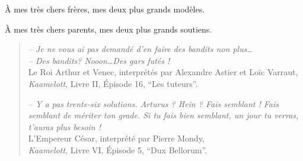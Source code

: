 
\begin{dedication}

    À mes très chers frères, mes deux plus grands modèles.

    À mes très chers parents, mes deux plus grands soutiens.


    \vfill{}

    \hr{}


    \begin{small}
    \begin{quote}
        \emph{-- Je ne vous ai pas demandé d'en faire des \emph{bandits} non plus\dots}\\
        \emph{-- Des \emph{bandits}? Nooon\dots Des gars futés !}\\
        Le Roi Arthur et Venec,
        interprétés par Alexandre Astier et Loïc Varraut,\\
        \emph{Kaamelott}, Livre II, Épisode 16, ``Les tuteurs''.



    \vspace*{10pt}

        \emph{
            -- Y a pas trente-six solutions.
            Arturus ? Hein ? Fais semblant !
            Fais semblant de mériter ton grade.
            Si tu fais bien semblant, un jour tu verras, t'auras plus besoin !
        }\\
        L'Empereur César, interprété par Pierre Mondy,\\
        \emph{Kaamelott}, Livre VI, Épisode 5, ``Dux Bellorum''.


\end{quote}
\end{small}
\end{dedication}
